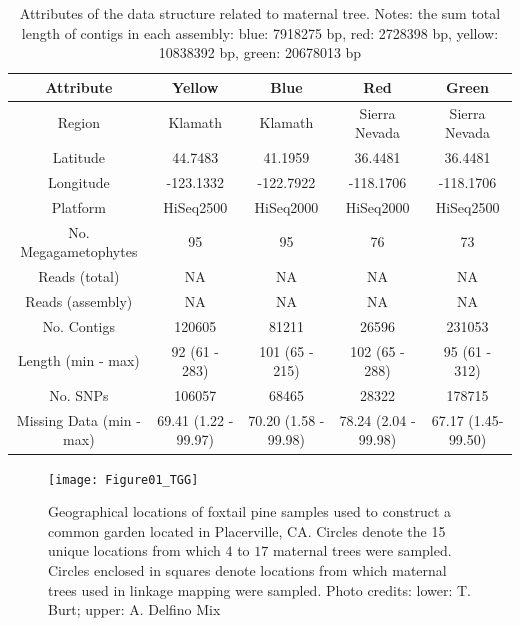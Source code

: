 \documentclass[11pt]{article}
\begin{document}
\singlespacing



\clearpage
\begin{landscape}

\begin{table}[ht]
\centering
\begin{tabular}{ccccc}
\toprule
Attribute & Yellow & Blue & Red & Green\\
\midrule
Region & Klamath & Klamath & Sierra Nevada & Sierra Nevada \\
Latitude & 44.7483 & 41.1959 & 36.4481 & 36.4481 \\
Longitude & -123.1332 & -122.7922 & -118.1706 & -118.1706 \\
Platform & HiSeq2500 & HiSeq2000 & HiSeq2000 & HiSeq2500 \\
No. Megagametophytes & 95 & 95 & 76 & 73 \\
Reads (total) & NA & NA & NA & NA \\
Reads (assembly) & NA & NA & NA & NA \\
No. Contigs & 120605 & 81211 & 26596 & 231053 \\
Length (min - max) & 92 (61 - 283) & 101 (65 - 215) & 102 (65 - 288)  & 95 (61 - 312) \\
No. SNPs & 106057 & 68465 & 28322 & 178715 \\
Missing Data (min - max) & 69.41 (1.22 - 99.97) & 70.20 (1.58 - 99.98) & 78.24 (2.04 - 99.98) & 67.17 (1.45-99.50) \\
\bottomrule
\end{tabular}
\caption{Attributes of the data structure related to maternal tree. Notes: the sum total length of
contigs in each assembly: blue: 7918275 bp, red: 2728398 bp, yellow: 10838392 bp, green: 20678013 bp} 
\label{t:label}
\end{table}
\end{landscape}

\clearpage

\begin{figure}[ht]
\centering
\texttt{[image: Figure01\_TGG]}
\caption{Geographical locations of foxtail pine samples used to construct a common garden located in Placerville, CA. Circles 
denote the 15 unique locations from which $4$ to $17$ maternal trees were sampled. Circles enclosed in squares denote 
locations from which maternal trees used in linkage mapping were sampled. Photo credits: lower: T. Burt; upper: A. Delfino Mix}
\label{f:Figure01_TGG}
\end{figure}
\end{document}
